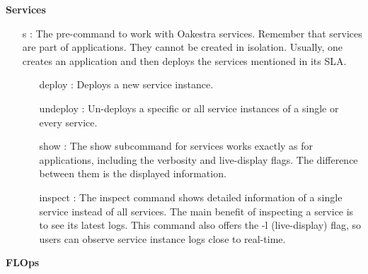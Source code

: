 \vspace{5mm}
\textbf{Services}
\begin{itemize}
    \item [s]:
        The pre-command to work with Oakestra services.
        Remember that services are part of applications.
        They cannot be created in isolation.
        Usually, one creates an application and then deploys the services mentioned in its SLA.
        \begin{itemize}
            \item [deploy]:
                Deploys a new service instance.
            \item [undeploy]:
                Un-deploys a specific or all service instances of a single or every service.
            \item [show]:
                The show subcommand for services works exactly as for applications, including the verbosity and live-display flags.
                The difference between them is the displayed information.
            \item [inspect]:
                The inspect command shows detailed information of a single service instead of all services.
                The main benefit of inspecting a service is to see its latest logs.
                This command also offers the -l (live-display) flag, so users can observe service instance logs close to real-time.
        \end{itemize}
\end{itemize}
\vspace{5mm}
\textbf{FLOps}
